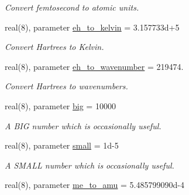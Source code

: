 \begin{DoxyCompactItemize}
\begin{DoxyCompactList}\small\item\em Convert femtosecond to atomic units. \end{DoxyCompactList}\item 
\mbox{\label{namespaceconstants_a3a20b8fd3876e28c1bb4fa9d92638ad5}} 
real(8), parameter \mbox{\hyperlink{namespaceconstants_a3a20b8fd3876e28c1bb4fa9d92638ad5}{eh\+\_\+to\+\_\+kelvin}} = 3.\+157733d+5
\begin{DoxyCompactList}\small\item\em Convert Hartrees to Kelvin. \end{DoxyCompactList}\item 
\mbox{\label{namespaceconstants_a06fac0412cc3447ce4aca18f4f28d6d5}} 
real(8), parameter \mbox{\hyperlink{namespaceconstants_a06fac0412cc3447ce4aca18f4f28d6d5}{eh\+\_\+to\+\_\+wavenumber}} = 219474.
\begin{DoxyCompactList}\small\item\em Convert Hartrees to wavenumbers. \end{DoxyCompactList}\item 
\mbox{\label{namespaceconstants_a230d8251b9e49519350b429de2a54d2b}} 
real(8), parameter \mbox{\hyperlink{namespaceconstants_a230d8251b9e49519350b429de2a54d2b}{big}} = 10000
\begin{DoxyCompactList}\small\item\em A \textquotesingle{}B\+IG\textquotesingle{} number which is occasionally useful. \end{DoxyCompactList}\item 
\mbox{\label{namespaceconstants_ab987536840cc4d73e63fc4efd304515f}} 
real(8), parameter \mbox{\hyperlink{namespaceconstants_ab987536840cc4d73e63fc4efd304515f}{small}} = 1d-\/5
\begin{DoxyCompactList}\small\item\em A \textquotesingle{}S\+M\+A\+LL\textquotesingle{} number which is occasionally useful. \end{DoxyCompactList}\item 
\mbox{\label{namespaceconstants_a1c0f07537d9d6d370f00cc17d9bd71fe}} 
real(8), parameter \mbox{\hyperlink{namespaceconstants_a1c0f07537d9d6d370f00cc17d9bd71fe}{me\+\_\+to\+\_\+amu}} = 5.\+485799090d-\/4

\end{DoxyCompactItemize}
